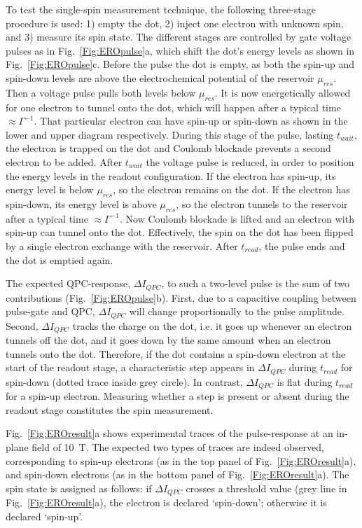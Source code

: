 \documentclass[rmp,twocolumn,aps]{revtex4}
\begin{document}
To test the single-spin measurement technique, the following
three-stage procedure is used: 1) empty the dot, 2) inject one
electron with unknown spin, and 3) measure its spin state. The
different stages are controlled by gate voltage pulses as in
Fig.~\ref{Fig:EROpulse}a, which shift the dot's energy levels as
shown in Fig.~\ref{Fig:EROpulse}c. Before the pulse the dot is
empty, as both the spin-up and spin-down levels are above the
electrochemical potential of the reservoir $\mu_{res}$. Then a
voltage pulse pulls both levels below $\mu_{res}$. It is now
energetically allowed for one electron to tunnel onto the dot,
which will happen after a typical time $\approx \Gamma^{-1}$. That
particular electron can have spin-up or spin-down as shown in the
lower and upper diagram respectively. During this stage of the
pulse, lasting $t_{wait}$, the electron is trapped on the dot and
Coulomb blockade prevents a second electron to be added. After
$t_{wait}$ the voltage pulse is reduced, in order to position the
energy levels in the readout configuration. If the electron has
spin-up, its energy level is below $\mu_{res}$, so the electron
remains on the dot. If the electron has spin-down, its energy
level is above $\mu_{res}$, so the electron tunnels to the
reservoir after a typical time $\approx \Gamma^{-1}$. Now Coulomb
blockade is lifted and an electron with spin-up can tunnel onto
the dot. Effectively, the spin on the dot has been flipped by a
single electron exchange with the reservoir. After $t_{read}$, the
pulse ends and the dot is emptied again.

The expected QPC-response, $\Delta I_{QPC}$, to such a two-level
pulse is the sum of two contributions (Fig.~\ref{Fig:EROpulse}b).
First, due to a capacitive coupling between pulse-gate and QPC,
$\Delta I_{QPC}$ will change proportionally to the pulse
amplitude. Second, $\Delta I_{QPC}$ tracks the charge on the dot,
i.e. it goes up whenever an electron tunnels off the dot, and it
goes down by the same amount when an electron tunnels onto the
dot. Therefore, if the dot contains a spin-down electron at the
start of the readout stage, a characteristic step appears in
$\Delta I_{QPC}$ during $t_{read}$ for spin-down (dotted trace
inside grey circle). In contrast, $\Delta I_{QPC}$ is flat during
$t_{read}$ for a spin-up electron. Measuring whether a step is
present or absent during the readout stage constitutes the spin
measurement.

Fig.~\ref{Fig:EROresult}a shows experimental traces of the
pulse-response at an in-plane field of 10~T. The expected two
types of traces are indeed observed, corresponding to spin-up
electrons (as in the top panel of Fig.~\ref{Fig:EROresult}a), and
spin-down electrons (as in the bottom panel of
Fig.~\ref{Fig:EROresult}a). The spin state is assigned as follows:
if $\Delta I_{QPC}$ crosses a threshold value (grey line in
Fig.~\ref{Fig:EROresult}a), the electron is declared `spin-down';
otherwise it is declared `spin-up'.
\end{document}
